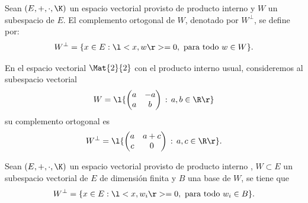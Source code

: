 \documentclass[compacto,10pt]{pubciencias-notas}
\begin{document}
\begin{defi}
Sean $(E,+,\cdot,\K)$ un espacio vectorial provisto de producto interno y
$W$ un subespacio de $E$. El complemento ortogonal de $W$, denotado por $W^\perp$, se define por:
\[
    W^\perp = \{ x \in E: \l< x, w \r> = 0, \text{ para todo } w \in W\}.
\]
\end{defi}


\begin{ejem}\hspace{0pt}\label{Complemento2} En el espacio vectorial $\Mat{2}{2}$ con el producto interno usual, consideremos al subespacio vectorial
\[
    W = \l\{\begin{pmatrix}a&- a\\a&b\end{pmatrix}\,:\,a,b\in\R\r\}
\]
su complemento ortogonal es
\[
    W^{\perp} = \l\{\begin{pmatrix}a&a+c\\c&0 \end{pmatrix}\,:\,a,c\in\R\r\}.
\]
\end{ejem}

\begin{prop}
Sean $(E,+,\cdot,\K)$ un espacio vectorial provisto de producto interno , 
$W \subset E$ un subespacio vectorial de $E$ de dimensión finita y $B$ una base de $W$, se tiene que
\[
    W^\perp = \{ x \in E: \l< x, w_{i} \r> = 0, \text{ para todo } w_{i} \in B\}.
\]
\end{prop}
\end{document}
